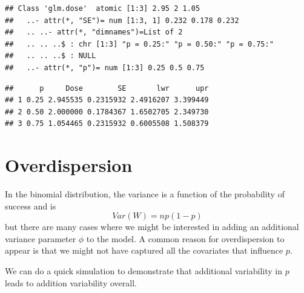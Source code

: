 \documentclass[]{book}
\newenvironment{Shaded}{\begin{snugshade}}{\end{snugshade}}
\newcommand{\KeywordTok}[1]{\textcolor[rgb]{0.13,0.29,0.53}{\textbf{{#1}}}}
\newcommand{\DataTypeTok}[1]{\textcolor[rgb]{0.13,0.29,0.53}{{#1}}}
\newcommand{\DecValTok}[1]{\textcolor[rgb]{0.00,0.00,0.81}{{#1}}}
\newcommand{\StringTok}[1]{\textcolor[rgb]{0.31,0.60,0.02}{{#1}}}
\newcommand{\CommentTok}[1]{\textcolor[rgb]{0.56,0.35,0.01}{\textit{{#1}}}}
\newcommand{\NormalTok}[1]{{#1}}
\theoremstyle{definition}
\theoremstyle{definition}
\theoremstyle{remark}
\begin{document}
\begin{verbatim}
## Class 'glm.dose'  atomic [1:3] 2.95 2 1.05
##   ..- attr(*, "SE")= num [1:3, 1] 0.232 0.178 0.232
##   .. ..- attr(*, "dimnames")=List of 2
##   .. .. ..$ : chr [1:3] "p = 0.25:" "p = 0.50:" "p = 0.75:"
##   .. .. ..$ : NULL
##   ..- attr(*, "p")= num [1:3] 0.25 0.5 0.75
\end{verbatim}

\begin{Shaded}
\end{Shaded}

\begin{verbatim}
##      p     Dose        SE       lwr      upr
## 1 0.25 2.945535 0.2315932 2.4916207 3.399449
## 2 0.50 2.000000 0.1784367 1.6502705 2.349730
## 3 0.75 1.054465 0.2315932 0.6005508 1.508379
\end{verbatim}

\section{Overdispersion}\label{overdispersion}

In the binomial distribution, the variance is a function of the
probability of success and is \[Var\left(W\right)=np\left(1-p\right)\]
but there are many cases where we might be interested in adding an
additional variance parameter \(\phi\) to the model. A common reason for
overdispersion to appear is that we might not have captured all the
covariates that influence \(p\).

We can do a quick simulation to demonstrate that additional variability
in \(p\) leads to addition variability overall.
\end{document}
